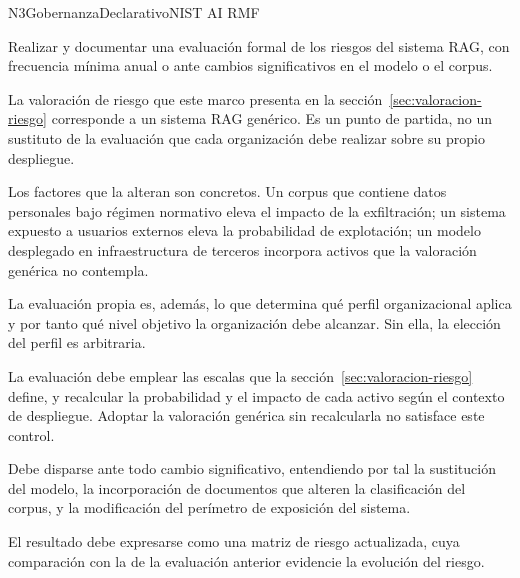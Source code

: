 
  {N3}{Gobernanza}{Declarativo}{NIST AI RMF}

Realizar y documentar una evaluación formal de los riesgos del sistema RAG, con frecuencia mínima anual o ante cambios significativos en el modelo o el corpus.

La valoración de riesgo que este marco presenta en la sección~\ref{sec:valoracion-riesgo} corresponde a un sistema RAG genérico. Es un punto de partida, no un sustituto de la evaluación que cada organización debe realizar sobre su propio despliegue.

Los factores que la alteran son concretos. Un corpus que contiene datos personales bajo régimen normativo eleva el impacto de la exfiltración; un sistema expuesto a usuarios externos eleva la probabilidad de explotación; un modelo desplegado en infraestructura de terceros incorpora activos que la valoración genérica no contempla.

La evaluación propia es, además, lo que determina qué perfil organizacional aplica y por tanto qué nivel objetivo la organización debe alcanzar. Sin ella, la elección del perfil es arbitraria.

La evaluación debe emplear las escalas que la sección~\ref{sec:valoracion-riesgo} define, y recalcular la probabilidad y el impacto de cada activo según el contexto de despliegue. Adoptar la valoración genérica sin recalcularla no satisface este control.

Debe disparse ante todo cambio significativo, entendiendo por tal la sustitución del modelo, la incorporación de documentos que alteren la clasificación del corpus, y la modificación del perímetro de exposición del sistema.

El resultado debe expresarse como una matriz de riesgo actualizada, cuya comparación con la de la evaluación anterior evidencie la evolución del riesgo.


